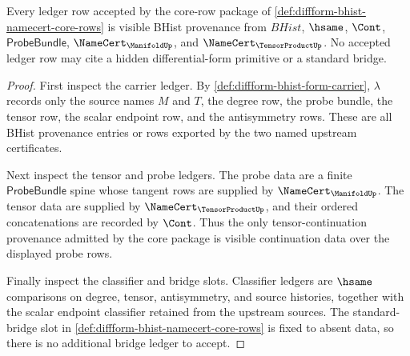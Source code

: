 \begin{theorem}
\label{thm:diffform-bhist-ledger-exactness-obligation}
Every ledger row accepted by the core-row package of
\autoref{def:diffform-bhist-namecert-core-rows} is visible BHist provenance
from $BHist$, $\hsame$, $\Cont$, $\mathsf{ProbeBundle}$,
$\NameCert_{\ManifoldUp}$, and $\NameCert_{\TensorProductUp}$. No accepted
ledger row may cite a hidden differential-form primitive or a standard bridge.
\end{theorem}
\begin{proof}
First inspect the carrier ledger. By
\autoref{def:diffform-bhist-form-carrier}, $\lambda$ records only the source
names $M$ and $T$, the degree row, the probe bundle, the tensor row, the
scalar endpoint row, and the antisymmetry rows. These are all BHist
provenance entries or rows exported by the two named upstream certificates.

Next inspect the tensor and probe ledgers. The probe data are a finite
$\mathsf{ProbeBundle}$ spine whose tangent rows are supplied by
$\NameCert_{\ManifoldUp}$. The tensor data are supplied by
$\NameCert_{\TensorProductUp}$, and their ordered concatenations are recorded
by $\Cont$. Thus the only tensor-continuation provenance admitted by the
core package is visible continuation data over the displayed probe rows.

Finally inspect the classifier and bridge slots. Classifier ledgers are
$\hsame$ comparisons on degree, tensor, antisymmetry, and source histories,
together with the scalar endpoint classifier retained from the upstream
sources. The standard-bridge slot in
\autoref{def:diffform-bhist-namecert-core-rows} is fixed to absent data, so
there is no additional bridge ledger to accept.
\end{proof}


